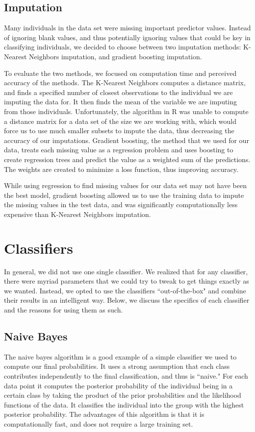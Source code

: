 \documentclass[11pt, oneside]{article}   	%
\begin{document}
 	\subsection{Imputation}
	Many individuals in the data set were missing important predictor values. 
	Instead of ignoring blank values, and thus potentially ignoring values that could be key in 
	classifying individuals, we decided to choose between two imputation methods: K-Nearest 
	Neighbors imputation, and gradient boosting imputation. 
	
	To evaluate the two methods, we 
	focused on computation time and perceived accuracy of the methods. The K-Nearest Neighbors 
	computes a distance matrix, and finds a specified number of closest observations to the 
	individual we are imputing the data for. It then finds the mean of the variable we are imputing 
	from those individuals. Unfortunately, the algorithm in R was unable to compute a distance
	matrix for a data set of the size we are working with, which would force us to use much smaller
	subsets to impute the data, thus decreasing the accuracy of our imputations. Gradient
	boosting, the method that we used for our data, treats each missing value as a regression
	problem and uses boosting to create regression trees and predict the value as a weighted
	sum of the predictions. The weights are created to minimize a loss function, thus improving
	accuracy. 
	
	While using regression to find missing values for our data set may not have been
	the best model, gradient boosting allowed us to use the training data to impute the missing 
	values in the test data, and was significantly computationally less expensive than K-Nearest
	Neighbors imputation. 
\section{Classifiers}
In general, we did not use one single classifier. We realized that for any classifier, there were myriad
parameters that we could try to tweak to get things exactly as we wanted. Instead, we 
opted to use the classifiers ``out-of-the-box" and combine their results in an intelligent way. 
Below, we discuss the specifics of each classifier and the reasons for using them as such.
	\subsection{Naive Bayes}
	The naive bayes algorithm is a good example of a simple classifier we used to compute our 
	final probabilities. It uses a strong assumption that each class contributes independently to the final classification, and thus is ``naive." For each data point it computes the posterior probability of the individual being in a certain class by taking the product of the prior probabilities and the likelihood functions of the data. It classifies the individual into the group with the highest posterior probability. The advantages of this algorithm is that it is computationally fast, and does not require a large training set. 
\end{document}
